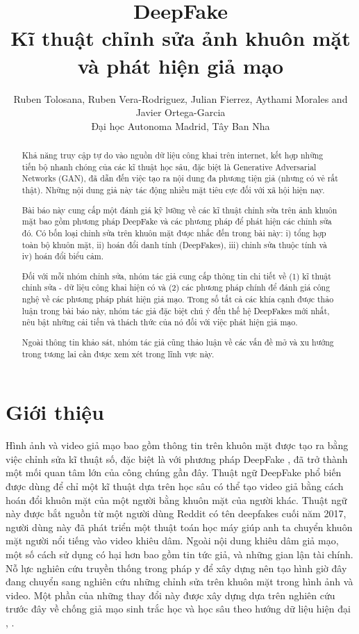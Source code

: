 \documentclass{article}
\title{DeepFake\\
Kĩ thuật chỉnh sửa ảnh khuôn mặt và phát hiện giả mạo}
\author{
Ruben Tolosana, Ruben Vera-Rodriguez, Julian Fierrez, Aythami Morales and Javier Ortega-Garcia\\
Đại học Autonoma Madrid, Tây Ban Nha
}
\begin{document}
\maketitle

\begin{abstract}

Khả năng truy cập tự do vào nguồn dữ liệu công khai trên internet, kết hợp những tiến bộ nhanh chóng của các kĩ thuật học sâu, đặc biệt là Generative Adversarial Networks (GAN), đã dẫn đến việc tạo ra nội dung đa phương tiện giả (nhưng có vẻ rất thật). Những nội dung giả này tác động nhiều mặt tiêu cực đối với xã hội hiện nay.

Bài báo này cung cấp một đánh giá kỹ lưỡng về các kĩ thuật chỉnh sửa trên ảnh khuôn mặt bao gồm phương pháp DeepFake và các phương pháp để phát hiện các chỉnh sửa đó. Có bốn loại chỉnh sửa trên khuôn mặt được nhắc đến trong bài này:
i) tổng hợp toàn bộ khuôn mặt,
ii) hoán đổi danh tính (DeepFakes),
iii) chỉnh sửa thuộc tính và
iv) hoán đổi biểu cảm.

Đối với mỗi nhóm chỉnh sửa, nhóm tác giả cung cấp thông tin chi tiết về (1) kĩ thuật chỉnh sửa - dữ liệu công khai hiện có và (2) các phương pháp chính để đánh giá công nghệ về các phương pháp phát hiện giả mạo. Trong số tất cả các khía cạnh được thảo luận trong bài báo này, nhóm tác giả đặc biệt chú ý đến thế hệ DeepFakes mới nhất, nêu bật những cải tiến và thách thức của nó đối với việc phát hiện giả mạo.

Ngoài thông tin khảo sát, nhóm tác giả cũng thảo luận về các vấn đề mở và xu hướng trong tương lai cần được xem xét trong lĩnh vực này.

\end{abstract}

\section{Giới thiệu} \label{sec:1-introduction}

Hình ảnh và video giả mạo bao gồm thông tin trên khuôn mặt được tạo ra bằng việc chỉnh sửa kĩ thuật số, đặc biệt là với phương pháp DeepFake , đã trở thành một mối quan tâm lớn của công chúng gần đây. Thuật ngữ DeepFake phổ biến được dùng để chỉ một kĩ thuật dựa trên học sâu có thể tạo video giả bằng cách hoán đổi khuôn mặt của một người bằng khuôn mặt của người khác. Thuật ngữ này được bắt nguồn từ một người dùng Reddit có tên deepfakes cuối năm 2017, người dùng này đã phát triển một thuật toán học máy giúp anh ta chuyển khuôn mặt người nổi tiếng vào video khiêu dâm. Ngoài nội dung khiêu dâm giả mạo, một số cách sử dụng có hại hơn bao gồm tin tức giả, và những gian lận tài chính.
Nỗ lực nghiên cứu truyền thống trong pháp y để xây dựng nên tạo hình giờ đây đang chuyển sang nghiên cứu những chỉnh sửa trên khuôn mặt trong hình ảnh và video. Một phần của những thay đổi này được xây dựng dựa trên nghiên cứu trước đây về chống giả mạo sinh trắc học    và học sâu theo hướng dữ liệu hiện đại , .
\end{document}
